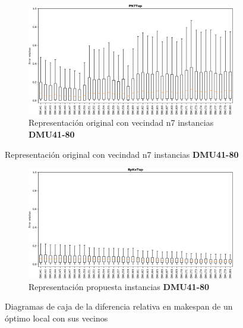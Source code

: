 \begin{figure}[hbtp]
    \begin{subfigure}{\textwidth}
        \centering
        \includegraphics[scale=.6]{Imagenes/bxpn7_2.png}
        \caption{Representación original con vecindad n7 instancias \textbf{DMU41-80}}
    \end{subfigure}
\end{figure}
\begin{figure}[H]\ContinuedFloat
    \begin{subfigure}{\textwidth}
        \centering
        \includegraphics[scale=.6]{Imagenes/bxppr_2.png}
        \caption{Representación propuesta instancias \textbf{DMU41-80}}
    \end{subfigure}
    \caption{Diagramas de caja de la diferencia relativa en makespan de un óptimo local con sus vecinos}
    \label{fig:bxp2}
\end{figure}

